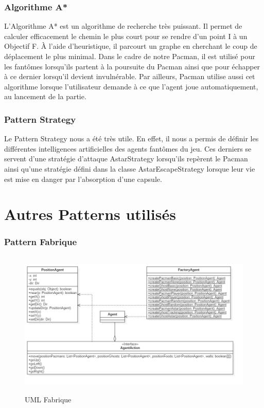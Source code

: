\documentclass[a4paper, 11pt]{article}
\begin{document}
\section{Algorithme A*}
  
L'Algorithme A* est un algorithme de recherche très puissant. Il permet de calculer efficacement le chemin le plus court pour se rendre d'un point I à un Objectif F.
À l'aide d'heuristique, il parcourt un graphe en cherchant le coup de déplacement le plus minimal. Dans le cadre de notre Pacman, il est utilisé
pour les fantômes lorsqu'ils partent à la poursuite du Pacman ainsi que pour échapper à ce dernier lorsqu'il devient invulnérable. Par ailleurs,
Pacman utilise aussi cet algorithme lorsque l'utilisateur demande à ce que l'agent joue automatiquement, au lancement de la partie. \\

\section{Pattern Strategy}
  
Le Pattern Strategy nous a été très utile. En effet, il nous a permis de définir les différentes intelligences artificielles des agents fantômes 
du jeu. Ces derniers se servent d'une stratégie d'attaque AstarStrategy lorsqu'ils repèrent le Pacman ainsi qu'une stratégie défini dans la classe 
AstarEscapeStrategy lorsque leur vie est mise en danger par l'absorption d'une capsule.

\part{Autres Patterns utilisés}

\section{Pattern Fabrique}
  
\begin{figure}[H]
  \begin{center}
  \includegraphics[height=7cm]{img/png/factory}
  \end{center}
  \caption[schema]{UML Fabrique}
\end{figure}
\end{document}

